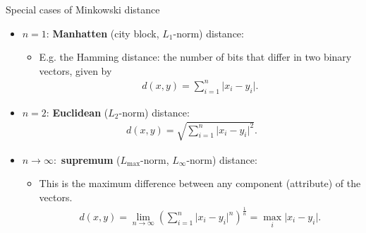 \documentclass[aspectratio=169,t]{beamer}
\begin{document}
  { 
    \begin{frame}{Special cases of Minkowski distance}
    \begin{itemize}
      \item $n=1$: \textbf{Manhatten} (city block, $L_1$-norm) distance:
      \begin{itemize}
        \item E.g. the Hamming distance: the number of bits that differ in two binary vectors, given by
        \begin{align}
          d(x,y) = \sum_{i=1}^{n} \vert x_i - y_i \vert.
        \end{align}
      \end{itemize}
      \item $n=2$: \textbf{Euclidean} ($L_2$-norm) distance:
            \begin{align}
              d(x,y) = \sqrt{\sum_{i=1}^{n} \vert x_i-y_i \vert^2}.
            \end{align}
      \item $n \rightarrow \infty:$ \textbf{supremum} ($L_{\text{max}}$-norm, $L_\infty$-norm) distance:
      \begin{itemize}
        \item This is the maximum difference between any component (attribute) of the vectors.
        \begin{align}
          d(x,y) = \lim_{n \rightarrow \infty} \left( \sum_{i=1}^{n} \vert x_i - y_i \vert^{n} \right)^{\frac{1}{n}} = \max_i \vert x_i-y_i \vert.
        \end{align}
      \end{itemize}
    \end{itemize}
    \end{frame}
  }
\end{document}
